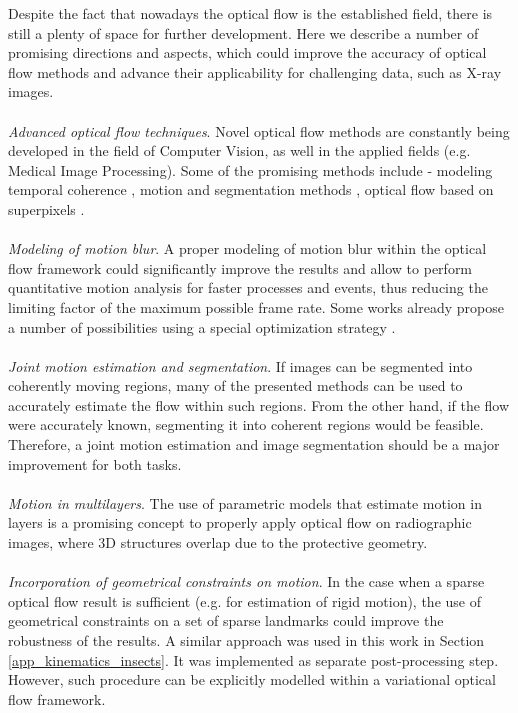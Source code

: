 Despite the fact that nowadays the optical flow is the established field, there is still a plenty of space for further development.  Here we describe a number of promising directions and aspects, which could improve the accuracy of optical flow methods and advance their applicability for challenging data, such as X-ray images.
\\
\\
\textit{Advanced optical flow techniques}. Novel optical flow methods are constantly being developed in the field of Computer Vision, as well in the applied fields (e.g. Medical Image Processing). Some of the promising methods include - modeling temporal coherence \cite{Volz11}, motion and segmentation methods , optical flow based on superpixels \cite{Amat13}.
\\
\\  
\textit{Modeling of motion blur}. A proper modeling of motion blur within the optical flow framework could significantly improve the results and allow to perform quantitative motion analysis for faster processes and events, thus reducing the limiting factor of the maximum possible frame rate. Some works already propose a number of possibilities using a special optimization strategy \cite{Seitz09}. 
\\
\\
\textit{Joint motion estimation and segmentation}. If images can be segmented into coherently moving regions, many of the presented methods can be used to accurately estimate the flow within such regions. From the other hand, if the flow were accurately known, segmenting it into coherent regions would be feasible. Therefore, a joint motion estimation and image segmentation should be a major improvement for both tasks.
\\
\\
\textit{Motion in multilayers}. The use of parametric models that estimate motion in layers \cite{Jepson93, Wang93, Ju96} is a promising concept to properly apply optical flow on radiographic images, where 3D structures overlap due to the protective geometry.
\\
\\   
\textit{Incorporation of geometrical constraints on motion}. In the case when a sparse optical flow result is sufficient (e.g. for estimation of rigid motion), the use of geometrical constraints on a set of sparse landmarks could improve the robustness of the results. A similar approach was used in this work in Section \ref{app_kinematics_insects}. It was implemented as separate post-processing step. However, such procedure can be explicitly modelled within a variational optical flow framework. 
